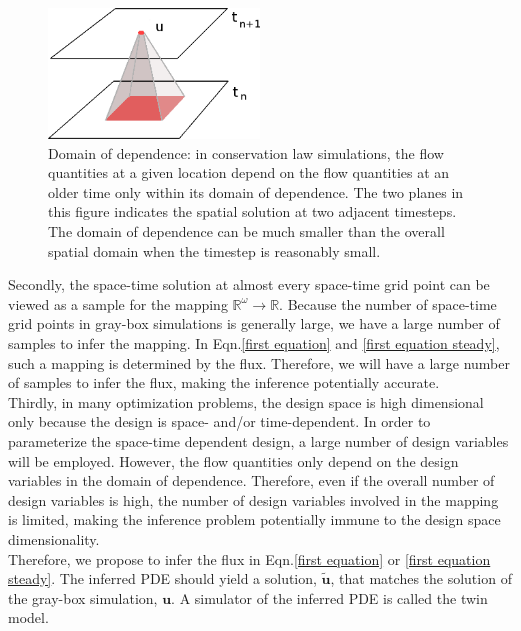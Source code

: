 \documentclass{paper1}
\begin{document}
\begin{figure}\begin{center}
    \includegraphics[width=0.5\textwidth, natwidth=100,natheight=100]{locality.png}
    \caption{Domain of dependence: in conservation law simulations,
             the flow quantities at a given location
             depend on the flow quantities at an older time only within its
             domain of dependence. The two planes in this figure indicates the spatial 
             solution at two adjacent timesteps.
             The domain of dependence can be much smaller
             than the overall spatial domain when the timestep is reasonably small.}
    \label{locality}
\end{center}\end{figure}


Secondly, the space-time solution at almost {every} space-time grid point can be viewed
as a sample for the mapping $\mathbb{R}^\omega \rightarrow \mathbb{R}$. 
Because the number of space-time grid points in gray-box simulations is generally large,
we have a large number of samples to infer the mapping. 
In Eqn.\eqref{first equation} and \eqref{first equation steady},
such a mapping is determined by the flux.
Therefore, we will have a large number of samples to infer the flux,
making the inference potentially accurate.\\

Thirdly, in many optimization problems, the design space is high dimensional only because
the design is space- and/or time-dependent. In order to parameterize the space-time dependent
design, a large number of design variables will be employed. However, 
the flow quantities only depend on the design variables in the domain of dependence.
Therefore, even if the overall number of design variables is high, the number of design variables
involved in the mapping is limited, making the inference problem potentially
immune to the design space dimensionality.\\

Therefore, we propose to infer the flux in Eqn.\eqref{first equation} or
\eqref{first equation steady}. The inferred
PDE should yield a solution, $\tilde{\boldsymbol{u}}$, that matches 
the solution of the gray-box simulation, $\boldsymbol{u}$.
A simulator of the inferred PDE is called the {twin model}.
\end{document}
